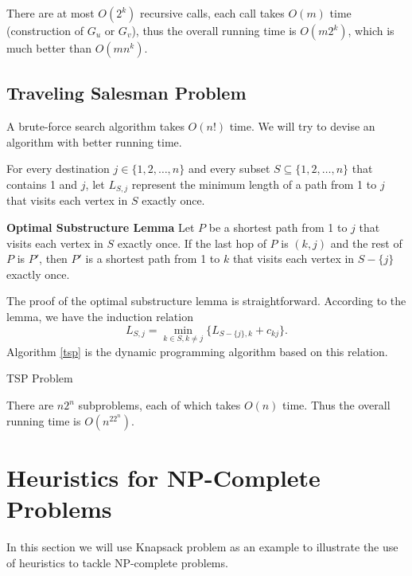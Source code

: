 There are at most $O(2^k)$ recursive calls, each call takes $O(m)$ time (construction of $G_u$ or $G_v$), thus the overall running time is $O(m2^k)$, which is much better than $O(mn^k)$.

\subsection{Traveling Salesman Problem}
A brute-force search algorithm takes $O(n!)$ time. We will try to devise an algorithm with better running time. 

For every destination $j\in\{1,2,\dots,n\}$ and every subset $S\subseteq\{1,2,\dots,n\}$ that contains 1 and $j$, let $L_{S,j}$ represent the minimum length of a path from 1 to $j$ that visits each vertex in $S$ exactly once.
\begin{lemma}\textbf{Optimal Substructure Lemma}
Let $P$ be a shortest path from 1 to $j$ that visits each vertex in $S$ exactly once. If the last hop of $P$ is $(k,j)$ and the rest of $P$ is $P'$, then $P'$ is a shortest path from 1 to $k$ that visits each vertex in $S-\{j\}$ exactly once. 
\end{lemma}
The proof of the optimal substructure lemma is straightforward. According to the lemma, we have the induction relation
$$L_{S,j}=\min_{k\in S,k\neq j}\{L_{S-\{j\},k}+c_{kj}\}.$$
Algorithm \ref{tsp} is the dynamic programming algorithm based on this relation.
\begin{algorithm}[ht]
\caption{TSP Problem}\label{tsp}
\begin{algorithmic}[1]
\EndFor\EndFor\EndFor
{}
\end{algorithmic}
\end{algorithm}

There are $n2^n$ subproblems, each of which takes $O(n)$ time. Thus the overall running time is $O(n^22^n)$.

\section{Heuristics for NP-Complete Problems}
In this section we will use Knapsack problem as an example to illustrate the use of heuristics to tackle NP-complete problems.
